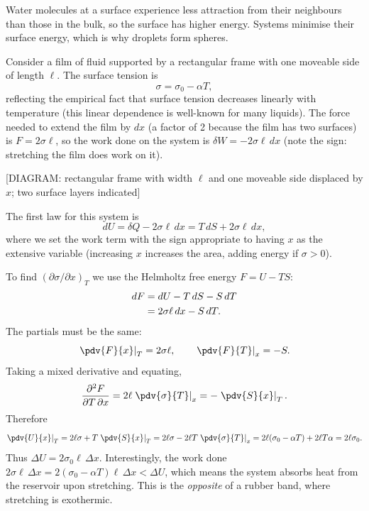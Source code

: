 Water molecules at a surface experience less attraction from their neighbours than those in the
bulk, so the surface has higher energy.  Systems minimise their surface energy, which is why
droplets form spheres.

Consider a film of fluid supported by a rectangular frame with one moveable side of length
$\ell$.  The surface tension is
\begin{equation}
    \sigma = \sigma_0 - \alpha T,
\end{equation}
reflecting the empirical fact that surface tension decreases linearly with temperature (this
linear dependence is well-known for many liquids).  The force needed to extend the film by
$dx$ (a factor of 2 because the film has two surfaces) is $F = 2\sigma\ell$, so the work done
on the system is $\delta W = -2\sigma\ell\,dx$ (note the sign: stretching the film does work on
it).

\begin{center}[DIAGRAM: rectangular frame with width $\ell$ and one moveable side displaced by $x$; two surface layers indicated]\end{center}

The first law for this system is
\begin{equation}
    dU = \delta Q - 2\sigma\ell\,dx = T\,dS + 2\sigma\ell\,dx,
\end{equation}
where we set the work term with the sign appropriate to having $x$ as the extensive variable
(increasing $x$ increases the area, adding energy if $\sigma>0$).

To find $(\partial\sigma/\partial x)_T$ we use the Helmholtz free energy $F = U - TS$:
\begin{align}
    dF &= dU - T\,dS - S\,dT \notag\\
       &= 2\sigma\ell\,dx - S\,dT.
\end{align}
The partials must be the same:
\begin{equation}
    \left.\pdv{F}{x}\right|_T = 2\sigma\ell, \qquad
    \left.\pdv{F}{T}\right|_x = -S.
\end{equation}
Taking a mixed derivative and equating,
\begin{equation}
    \frac{\partial^2 F}{\partial T\,\partial x} = 2\ell\left.\pdv{\sigma}{T}\right|_x
    = -\left.\pdv{S}{x}\right|_T.
\end{equation}
Therefore
\begin{equation}
    \left.\pdv{U}{x}\right|_T = 2\ell\sigma + T\left.\pdv{S}{x}\right|_T
    = 2\ell\sigma - 2\ell T\left.\pdv{\sigma}{T}\right|_x
    = 2\ell(\sigma_0 - \alpha T) + 2\ell T\alpha = 2\ell\sigma_0.
\end{equation}
Thus $\Delta U = 2\sigma_0\ell\,\Delta x$.  Interestingly, the work done $2\sigma\ell\,\Delta x
= 2(\sigma_0-\alpha T)\ell\,\Delta x < \Delta U$, which means the system absorbs heat from the
reservoir upon stretching.  This is the \emph{opposite} of a rubber band, where stretching is
exothermic.

